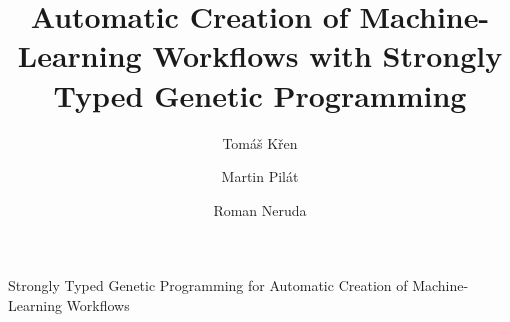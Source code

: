 \documentclass{ws-ijait}
\begin{document}
\newcommand{\red}[1]{{\color{red} #1}}

{Strongly Typed Genetic Programming for Automatic Creation of Machine-Learning
Workflows}

%
\catchline{}{}{}{}{}
%

\title{Automatic Creation of Machine-Learning Workflows with Strongly Typed
Genetic Programming}


\author{Tom\'a\v{s} K\v{r}en}

\address{Charles University, Faculty of Mathematics and Physics, Malostransk\'e
n\'am\v{e}st\'i 25, 118 00 Prague, Czech Republic, Tomas.Kren@mff.cuni.cz}

\author{Martin Pil\'at}
\address{Charles University, Faculty of Mathematics and Physics, Malostransk\'e
n\'am\v{e}st\'i 25, 118 00 Prague, Czech Republic, Martin.Pilat@mff.cuni.cz}


\author{Roman Neruda}
\address{Institute of Computer Science, The Czech Academy of Sciences, 
Pod Vod\'arenskou v\v{e}\v{z}\'i 271/2, 182 07 Prague, Czech Republic, 
roman@cs.cas.cz}

\newcommand{\ar}{\rightarrow}
\newcommand{\Dlong}{unlabeled data\xspace}
\newcommand{\LDlong}{labeled data\xspace}
\newcommand{\Dshort}{\textit{$D$}\xspace}
\newcommand{\LDshort}{\textit{$LD$}\xspace}
\newcommand{\dia}{\textit{$ens_1$}\xspace}
\newcommand{\diaZero}{\textit{$ens_0$}\xspace}
\newcommand{\splitComb}{\textit{$split$}\xspace}
\newcommand{\cons}{\textit{$cons$}\xspace}

\newcommand{\komb}[1]{\textit{#1}}
\newcommand{\kons}[1]{\textit{#1}}

\newcommand{\Dag}{\kons{Dag}}
\newcommand{\D}{\kons{D}}
\newcommand{\LD}{\kons{LD}}
\newcommand{\Boo}{\kons{Boo}}
\newcommand{\V}{\kons{V}}
\newcommand{\Succ}{\kons{S}}
\newcommand{\Zero}{\kons{0}}
\newcommand{\Same}{\kons{Same}}
\newcommand{\Disjoint}{\kons{Disjoint}}

\newcommand{\Suc}[1]{(\Succ\ #1)}
\newcommand{\Ve}[3]{(\V\ #1\ #2\ #3)}

\newcommand{\DAG}[2]{(\Dag\ #1\ #2)}
\newcommand{\splitter}[4]{\DAG{#1}{\Ve{#2}{#3}{#4}}}
\newcommand{\merger}[4]{\DAG{\Ve{#1}{#3}{#4}}{#2}}
\newcommand{\dvaPlus}[1]{\Suc{\Suc{#1}}}
\newcommand{\dva}{\dvaPlus{\Zero}}


\newcommand{\la}{\leftarrow\xspace}
\newcommand{\op}{\operatorname}
\newcommand{\mgu}[1]{\op{MGU}(#1)}
\end{document}
